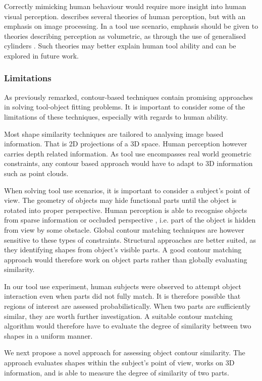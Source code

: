 \documentclass[11]{article}
\let \citeA \textcite
\begin{document}
Correctly mimicking human behaviour would require more insight into human visual perception.
\citeA{loncaric1998} describes several theories of human perception, but with an emphasis on image processing.
In a tool use scenario, emphasis should be given to theories describing perception as volumetric, as through the use of generalised cylinders \cite{dickinson2014}.
Such theories may better explain human tool ability and can be explored in future work.    

\subsubsection{Limitations}
As previously remarked, contour-based techniques contain promising approaches in solving tool-object fitting problems.
It is important to consider some of the limitations of these techniques, especially with regards to human ability. 

Most shape similarity techniques are tailored to analysing image based information. 
That is 2D projections of a 3D space.
Human perception however carries depth related information.
As tool use encompasses real world geometric constraints, any contour based approach would have to adapt to 3D information such as point clouds.

When solving tool use scenarios, it is important to consider a subject's point of view.
The geometry of objects may hide functional parts until the object is rotated into proper perspective.
Human perception is able to recognise objects from sparse information or occluded perspective \cite{loncaric1998}, i.e. part of the object is hidden from view by some obstacle.
Global contour matching techniques are however sensitive to these types of constraints.
Structural approaches are better suited, as they identifying shapes from object's visible parts.
A good contour matching approach would therefore work on object parts rather than globally evaluating similarity.

In our tool use experiment, human subjects were observed to attempt object interaction even when parts did not fully match. 
It is therefore possible that regions of interest are assessed probabilistically. 
When two parts are sufficiently similar, they are worth further investigation.
A suitable contour matching algorithm would therefore have to evaluate the degree of similarity between two shapes in a uniform manner. 

We next propose a novel approach for assessing object contour similarity.
The approach evaluates shapes within the subject's point of view, works on 3D information, and is able to measure the degree of similarity of two parts.
\end{document}
